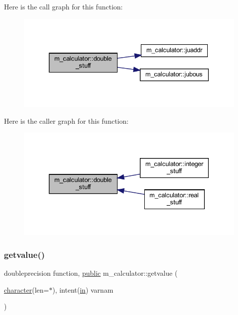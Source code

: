 Here is the call graph for this function\+:
\nopagebreak
\begin{figure}[H]
\begin{center}
\leavevmode
\includegraphics[width=330pt]{namespacem__calculator_ab70b7eb8f684537155298c061b54c356_cgraph}
\end{center}
\end{figure}
Here is the caller graph for this function\+:
\nopagebreak
\begin{figure}[H]
\begin{center}
\leavevmode
\includegraphics[width=330pt]{namespacem__calculator_ab70b7eb8f684537155298c061b54c356_icgraph}
\end{center}
\end{figure}
\mbox{\label{namespacem__calculator_ab8fa4f20b1e4db1b10ed4deb52b89b34}} 
\subsubsection{\texorpdfstring{getvalue()}{getvalue()}}
{\footnotesize\ttfamily doubleprecision function, \hyperlink{M__stopwatch_83_8txt_a2f74811300c361e53b430611a7d1769f}{public} m\+\_\+calculator\+::getvalue (\begin{DoxyParamCaption}\item[{\hyperlink{option__stopwatch_83_8txt_abd4b21fbbd175834027b5224bfe97e66}{character}(len=$\ast$), intent(\hyperlink{M__journal_83_8txt_afce72651d1eed785a2132bee863b2f38}{in})}]{varnam }\end{DoxyParamCaption})}



